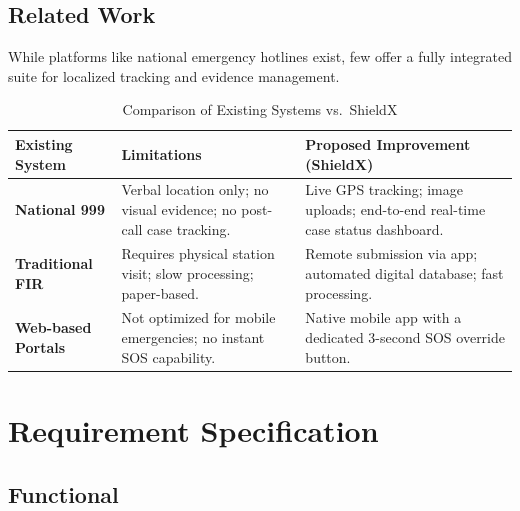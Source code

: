 \documentclass[12pt, a4paper, twoside]{report}
\begin{document}
\section{Related Work}
While platforms like national emergency hotlines exist, few offer a fully integrated suite for localized tracking and evidence management.
\begin{table}[ht]
\centering
\caption{Comparison of Existing Systems vs.\ ShieldX}
\label{tab:comparison}
\begin{tabularx}{\textwidth}{p{3.5cm} X X}
\toprule
\textbf{Existing System} & \textbf{Limitations} & \textbf{Proposed Improvement (ShieldX)} \\
\midrule
\textbf{National 999} & Verbal location only; no visual evidence; no post-call case tracking. & Live GPS tracking; image uploads; end-to-end real-time case status dashboard. \\
\addlinespace
\textbf{Traditional FIR} & Requires physical station visit; slow processing; paper-based. & Remote submission via app; automated digital database; fast processing. \\
\addlinespace
\textbf{Web-based Portals} & Not optimized for mobile emergencies; no instant SOS capability. & Native mobile app with a dedicated 3-second SOS override button. \\
\bottomrule
\end{tabularx}
\end{table}
\chapter{Requirement Specification}
\section{Functional}
\end{document}
